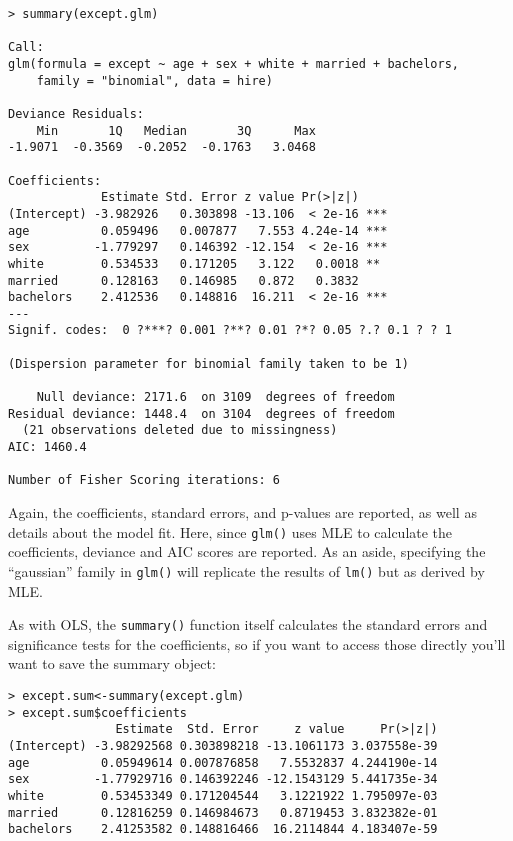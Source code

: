 \documentclass[12pt, oneside]{amsart}   	%
\begin{document}
\begin{verbatim}
> summary(except.glm)

Call:
glm(formula = except ~ age + sex + white + married + bachelors, 
    family = "binomial", data = hire)

Deviance Residuals: 
    Min       1Q   Median       3Q      Max  
-1.9071  -0.3569  -0.2052  -0.1763   3.0468  

Coefficients:
             Estimate Std. Error z value Pr(>|z|)    
(Intercept) -3.982926   0.303898 -13.106  < 2e-16 ***
age          0.059496   0.007877   7.553 4.24e-14 ***
sex         -1.779297   0.146392 -12.154  < 2e-16 ***
white        0.534533   0.171205   3.122   0.0018 ** 
married      0.128163   0.146985   0.872   0.3832    
bachelors    2.412536   0.148816  16.211  < 2e-16 ***
---
Signif. codes:  0 ?***? 0.001 ?**? 0.01 ?*? 0.05 ?.? 0.1 ? ? 1

(Dispersion parameter for binomial family taken to be 1)

    Null deviance: 2171.6  on 3109  degrees of freedom
Residual deviance: 1448.4  on 3104  degrees of freedom
  (21 observations deleted due to missingness)
AIC: 1460.4

Number of Fisher Scoring iterations: 6
\end{verbatim}

Again, the coefficients, standard errors, and p-values are reported, as well as details about the model fit. Here, since \texttt{glm()} uses MLE to calculate the coefficients, deviance and AIC scores are reported. As an aside, specifying the ``gaussian'' family in \texttt{glm()} will replicate the results of \texttt{lm()} but as derived by MLE. 

As with OLS, the \texttt{summary()} function itself calculates the standard errors and significance tests for the coefficients, so if you want to access those directly you'll want to save the summary object:

\begin{verbatim}
> except.sum<-summary(except.glm)
> except.sum$coefficients
               Estimate  Std. Error     z value     Pr(>|z|)
(Intercept) -3.98292568 0.303898218 -13.1061173 3.037558e-39
age          0.05949614 0.007876858   7.5532837 4.244190e-14
sex         -1.77929716 0.146392246 -12.1543129 5.441735e-34
white        0.53453349 0.171204544   3.1221922 1.795097e-03
married      0.12816259 0.146984673   0.8719453 3.832382e-01
bachelors    2.41253582 0.148816466  16.2114844 4.183407e-59
\end{verbatim}
\end{document}
